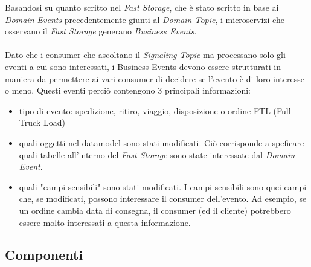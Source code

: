 Basandosi su quanto scritto nel \textit{Fast Storage}, che è stato scritto in base ai \textit{Domain Events} precedentemente giunti al \textit{Domain Topic},
i microservizi che osservano il \textit{Fast Storage} generano \textit{Business Events}.
\\\\
Dato che i consumer che ascoltano il \textit{Signaling Topic} ma processano solo gli eventi a cui sono interessati, 
i Business Events devono essere strutturati in maniera da permettere ai vari consumer di decidere se l'evento è di loro interesse o meno.
Questi eventi perciò contengono 3 principali informazioni:
\begin{itemize}
\item tipo di evento: spedizione, ritiro, viaggio, disposizione o ordine FTL (Full Truck Load)
\item quali oggetti nel datamodel sono stati modificati.
Ciò corrisponde a speficare quali tabelle all'interno del \textit{Fast Storage} sono state interessate dal \textit{Domain Event}.
\item quali "campi sensibili" sono stati modificati.
I campi sensibili sono quei campi che, se modificati, possono interessare il consumer dell'evento.
Ad esempio, se un ordine cambia data di consegna, il consumer (ed il cliente) potrebbero essere molto interessati a questa informazione.
\end{itemize}



\subsection{Componenti}
\label{subsec:components}

